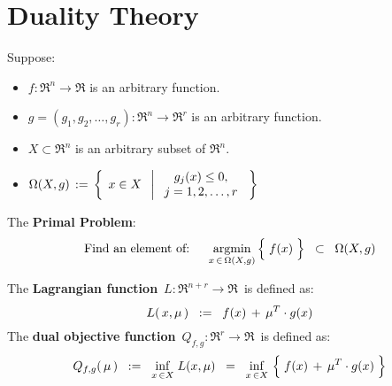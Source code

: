 

\section{Duality Theory}
\setcounter{theorem}{0}
\setcounter{equation}{0}


\renewcommand{\theenumi}{\roman{enumi}}
\renewcommand{\labelenumi}{\textnormal{(\theenumi)}$\;\;$}


\noindent
\begin{definition}
\mbox{}
\vskip 0.1cm
\noindent
Suppose:
\begin{itemize}
\item
	$f : \Re^{n} \longrightarrow \Re$ is an arbitrary function.
\item
	$g = (g_{1},g_{2},\ldots,g_{r}) : \Re^{n} \longrightarrow \Re^{r}$ is an arbitrary function.
\item
	$X \subset \Re^{n}$ is an arbitrary subset of $\Re^{n}$.
\item
	$\Omega(X,g) \, := \,
	\left\{\;\,
	x \overset{{\color{white}.}}{\in} X
	\;\;\left\vert\;
		\begin{array}{c}
			g_{j}(x) \leq 0,
			\\
			j = 1,2,\ldots,r
		\end{array}
		\right.
	\;\right\}$
\end{itemize}
The \textbf{Primal Problem}:
\begin{equation*}
\textnormal{Find an element of:}
\quad\;\;
\underset{x\,\in\,\Omega(X,g)}{\argmin}\left\{\;
	\overset{{\color{white}.}}{f(x)}
	\;\right\}
\;\; \subset \;\;
	\Omega(X,g)
\end{equation*}

\vskip 0.5cm
\noindent
The \textbf{Lagrangian function} \,$L : \Re^{n+r} \longrightarrow \Re$\, is defined as:
\begin{equation*}
L(\,x,\mu\,)
\;\; := \;\;
	f(x) \,\overset{{\color{white}.}}{+}\, \mu^{T}\cdot g(x)
\end{equation*}
The \textbf{dual objective function} \,$Q_{f,g} : \Re^{r} \longrightarrow \Re$\, is defined as:
\begin{equation*}
Q_{f,g}(\,\mu\,)
\;\; := \;\;
	\underset{x\,\in X}{\inf}\;L(x,\mu)
\;\; = \;\;
	\underset{x\,\in X}{\inf}\,\left\{\;f(x) \,\overset{{\color{white}.}}{+}\, \mu^{T}\cdot g(x)\;\right\}
\end{equation*}


\end{definition}
